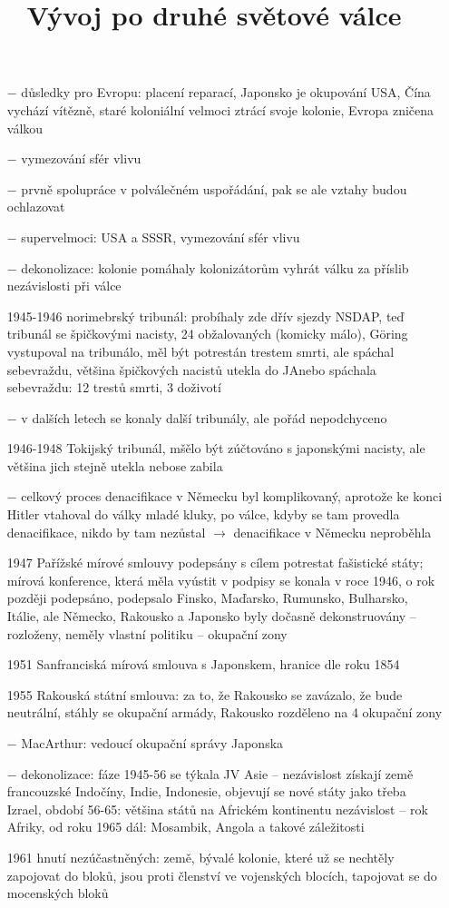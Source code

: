 \documentclass{article}
\title{\vspace{-2cm}Vývoj po druhé světové válce\vspace{-1.7cm}}
\date{}
\author{}
\begin{document}
\maketitle

\begin{itemize}
    \vspace{-0.5em}
    \setlength\itemsep{0.15em}
    \item[$-$] důsledky pro Evropu: placení reparací, Japonsko je okupování USA, Čína vychází vítězně, staré koloniální velmoci ztrácí svoje kolonie, Evropa zničena válkou
    \item[$-$] vymezování sfér vlivu
    \item[$-$] prvně spolupráce v polválečném uspořádání, pak se ale vztahy budou ochlazovat
    \item[$-$] supervelmoci: USA a SSSR, vymezování sfér vlivu
    \item[$-$] dekonolizace: kolonie pomáhaly kolonizátorům vyhrát válku  za příslib nezávislosti při válce
    \item[1945-1946] norimebrský tribunál: probíhaly zde dřív sjezdy NSDAP, teď tribunál se špičkovými nacisty, 24 obžalovaných (komicky málo), Göring vystupoval na tribunálo, měl být potrestán trestem smrti, ale spáchal sebevraždu, většina špičkových nacistů utekla do JAnebo spáchala sebevraždu: 12 trestů smrti, 3 doživotí
    \item[$-$] v dalších letech se konaly další tribunály, ale pořád nepodchyceno
    \item[1946-1948] Tokijský tribunál, mšělo být zúčtováno s japonskými nacisty, ale většina jich stejně utekla nebose zabila
    \item[$-$] celkový proces denacifikace v Německu byl komplikovaný, aprotože ke konci Hitler vtahoval do války mladé kluky, po válce, kdyby se tam provedla denacifikace, nikdo by tam nezůstal $\rightarrow$ denacifikace v Německu neproběhla
    \item[1947] Pařížské mírové smlouvy podepsány s cílem potrestat fašistické státy; mírová konference, která měla vyústit v podpisy se konala v roce 1946, o rok později podepsáno, podepsalo Finsko, Maďarsko, Rumunsko, Bulharsko, Itálie, ale Německo, Rakousko a Japonsko byly dočasně dekonstruovány -- rozloženy, neměly vlastní politiku -- okupační zony
    \item[1951] Sanfranciská mírová smlouva s Japonskem, hranice dle roku 1854
    \item[1955] Rakouská státní smlouva: za to, že Rakousko se zavázalo, že bude neutrální, stáhly se okupační armády, Rakousko rozděleno na 4 okupační zony
    \item[$-$] MacArthur: vedoucí okupační správy Japonska
    \item[$-$] dekonolizace: fáze 1945-56 se týkala JV Asie -- nezávislost získají země francouzské Indočíny, Indie, Indonesie, objevují se nové státy jako třeba Izrael, období 56-65: většina států na Africkém kontinentu nezávislost -- rok Afriky, od roku 1965 dál: Mosambik, Angola a takové záležitosti
    \item[1961] hnutí nezúčastněných: země, bývalé kolonie, které už se nechtěly zapojovat do bloků, jsou proti členství ve vojenských blocích, tapojovat se do mocenských bloků


\end{itemize}
\end{document}
